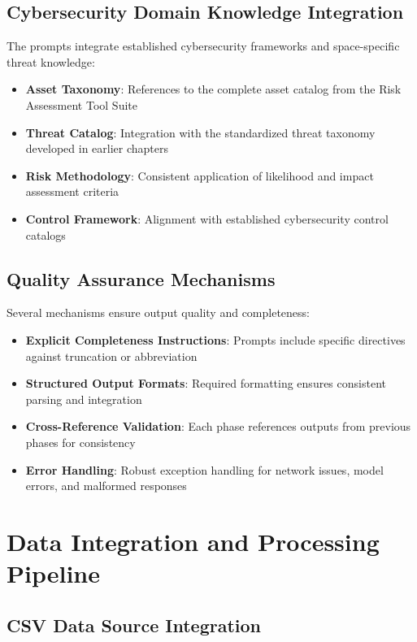 \documentclass[binding=0.6cm]{sapthesis}
\begin{document}
\subsection{Cybersecurity Domain Knowledge Integration}

The prompts integrate established cybersecurity frameworks and space-specific threat knowledge:

\begin{itemize}
    \item \textbf{Asset Taxonomy}: References to the complete asset catalog from the Risk Assessment Tool Suite
    \item \textbf{Threat Catalog}: Integration with the standardized threat taxonomy developed in earlier chapters
    \item \textbf{Risk Methodology}: Consistent application of likelihood and impact assessment criteria
    \item \textbf{Control Framework}: Alignment with established cybersecurity control catalogs
\end{itemize}

\subsection{Quality Assurance Mechanisms}

Several mechanisms ensure output quality and completeness:

\begin{itemize}
    \item \textbf{Explicit Completeness Instructions}: Prompts include specific directives against truncation or abbreviation
    \item \textbf{Structured Output Formats}: Required formatting ensures consistent parsing and integration
    \item \textbf{Cross-Reference Validation}: Each phase references outputs from previous phases for consistency
    \item \textbf{Error Handling}: Robust exception handling for network issues, model errors, and malformed responses
\end{itemize}

\section{Data Integration and Processing Pipeline}

\subsection{CSV Data Source Integration}
\end{document}
